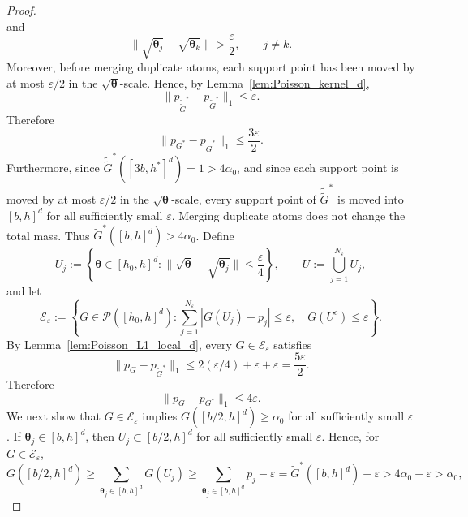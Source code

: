 \documentclass[twoside,12pt]{article}
\begin{document}
\begin{proof}
\begin{displaymath}
\end{displaymath}
and
\begin{displaymath}
\|\sqrt{\boldsymbol\theta_j}-\sqrt{\boldsymbol\theta_k}\|>\frac{\varepsilon}{2},\qquad j\neq k.
\end{displaymath}
Moreover, before merging duplicate atoms, each support point has been moved by at most $\varepsilon/2$ in the $\sqrt{\boldsymbol\theta}$-scale. Hence, by Lemma~\ref{lem:Poisson_kernel_d},
\begin{displaymath}
\|p_{\tilde{\tilde G}^\ast}-p_{\tilde G^\ast}\|_1\le\varepsilon.
\end{displaymath}
Therefore
\begin{displaymath}
\|p_{G^\ast}-p_{\tilde G^\ast}\|_1\le\frac{3\varepsilon}{2}.
\end{displaymath}
Furthermore, since $\tilde{\tilde G}^\ast([3b,h^\ast]^d)=1>4\alpha_0$, and since each support point is moved by at most $\varepsilon/2$ in the $\sqrt{\boldsymbol\theta}$-scale, every support point of $\tilde{\tilde G}^\ast$ is moved into $[b,h]^d$ for all sufficiently small $\varepsilon$. Merging duplicate atoms does not change the total mass.
Thus $\tilde G^\ast([b,h]^d)>4\alpha_0$. Define
\begin{displaymath}
U_j:=\left\{\boldsymbol\theta\in[h_{0},h]^d:\|\sqrt{\boldsymbol\theta}-\sqrt{\boldsymbol\theta_j}\|\le\frac{\varepsilon}{4}\right\},\qquad U:=\bigcup_{j=1}^{N_\varepsilon}U_j,
\end{displaymath}
and let
\begin{displaymath}
\mathcal E_\varepsilon:=\left\{G\in\mathcal P([h_{0},h]^d):\sum_{j=1}^{N_\varepsilon}|G(U_j)-p_j|\le\varepsilon,\quad G(U^c)\le\varepsilon\right\}.
\end{displaymath}
By Lemma~\ref{lem:Poisson_L1_local_d}, every $G\in\mathcal E_\varepsilon$ satisfies
\begin{displaymath}
\|p_G-p_{\tilde G^\ast}\|_1\le 2(\varepsilon/4)+\varepsilon+\varepsilon=\frac{5\varepsilon}{2}.
\end{displaymath}
Therefore
\begin{displaymath}
\|p_G-p_{G^\ast}\|_1\le 4\varepsilon.
\end{displaymath}
We next show that $G\in\mathcal E_\varepsilon$ implies $G([b/2,h]^d)\ge\alpha_0$ for all sufficiently small $\varepsilon$. If $\boldsymbol\theta_j\in[b,h]^d$, then $U_j\subset [b/2,h]^d$ for all sufficiently small $\varepsilon$. Hence, for $G\in\mathcal E_\varepsilon$,
\begin{displaymath}
G([b/2,h]^d)\ge\sum_{\boldsymbol\theta_j\in[b,h]^d}G(U_j)\ge\sum_{\boldsymbol\theta_j\in[b,h]^d}p_j-\varepsilon=\tilde G^\ast([b,h]^d)-\varepsilon>4\alpha_0-\varepsilon>\alpha_0,

\end{displaymath}
\end{proof}
\end{document}
